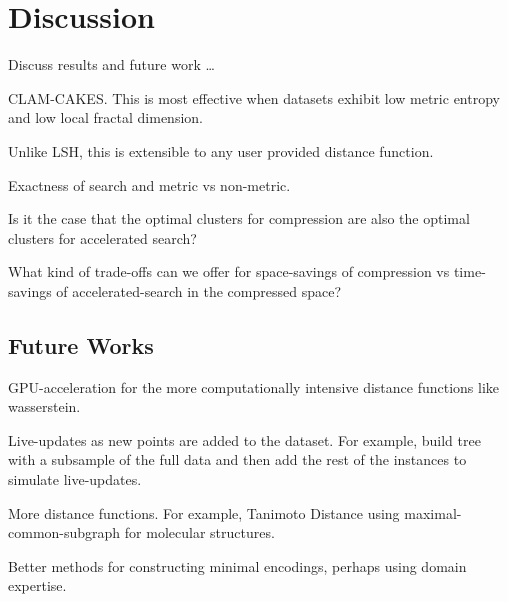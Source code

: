 \section{Discussion}
\label{sec:discussion}

Discuss results and future work \dots

CLAM-CAKES.
This is most effective when datasets exhibit low metric entropy and low local fractal dimension.

Unlike LSH, this is extensible to any user provided distance function.

Exactness of search and metric vs non-metric.

Is it the case that the optimal clusters for compression are also the optimal clusters for accelerated search?

What kind of trade-offs can we offer for space-savings of compression vs time-savings of accelerated-search in the compressed space?

\subsection{Future Works}
\label{subsec:results:future-works}

GPU-acceleration for the more computationally intensive distance functions like wasserstein.

Live-updates as new points are added to the dataset.
For example, build tree with a subsample of the full data and then add the rest of the instances to simulate live-updates.

More distance functions. For example, Tanimoto Distance using maximal-common-subgraph for molecular structures.

Better methods for constructing minimal encodings, perhaps using domain expertise.
